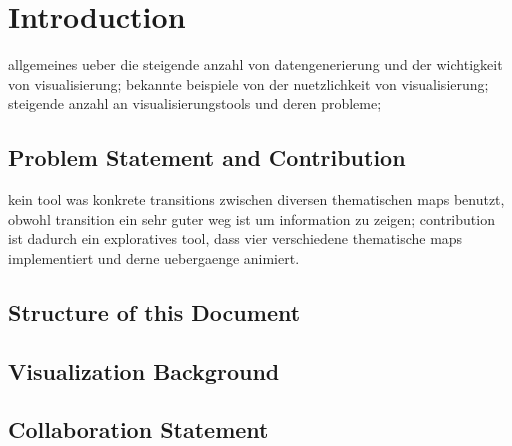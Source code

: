 \section{Introduction}
allgemeines ueber die steigende anzahl von datengenerierung und der wichtigkeit von visualisierung; bekannte beispiele von der nuetzlichkeit von visualisierung; steigende anzahl an visualisierungstools und deren probleme;

\subsection{Problem Statement and Contribution}
kein tool was konkrete transitions zwischen diversen thematischen maps benutzt, obwohl transition ein sehr guter weg ist um information zu zeigen; contribution ist dadurch ein exploratives tool, dass vier verschiedene thematische maps implementiert und derne uebergaenge animiert.

\subsection{Structure of this Document}

\subsection{Visualization Background}


\subsection{Collaboration Statement}